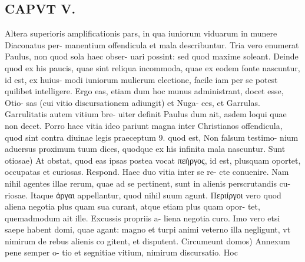 \documentclass{article}
\begin{document}
\begin{pages}
\section*{CAPVT  V. }
\marginpar{[ p.285 ]}\pstart Altera superioris amplificationis pars, in qua iuniorum viduarum in munere Diaconatus per- manentium offendicula et mala describuntur. Tria vero enumerat Paulus, non quod sola haec obser- uari possint: sed quod maxime soleant. Deinde quod ex his paucis, quae sint reliqua incommoda, quae ex eodem fonte nascuntur, id est, ex huius- modi iuniorum mulierum electione, facile iam per se potest quilibet intelligere. Ergo eas, etiam dum hoc munus administrant, docet esse, Otio- sas (cui vitio discursationem adiungit) et Nuga- ces, et Garrulas. Garrulitatis autem vitium bre- uiter definit Paulus dum ait, asdem loqui quae non decet. Porro haec vitia ideo pariunt magna inter Christianos offendicula, quod sint contra diuinae legis praeceptum 9. quod est, Non falsum testimo- nium aduersus proximum tuum dices, quodque ex his infinita mala nascuntur. Sunt otiosae) At obstat, quod eas ipsas postea vocat πεήργος, id est, plusquam oportet, occupatas et curiosas. Respond. Haec duo vitia inter se re- cte conuenire. Nam nihil agentes illae rerum, quae ad se pertinent, sunt in alienis perscrutandis cu- riosae. Itaque ἀργαι appellantur, quod nihil suum agunt. Περιίργοι vero quod aliena negotia plus quam sua curant, atque etiam plus quam opor- tet, quemadmodum ait ille. Excussis propriis a- liena negotia curo. Imo vero etsi saepe habent domi, quae agant: magno et turpi animi veterno illa negligunt, vt nimirum de rebus alienis co gitent, et disputent. Circumeunt domos) Annexum pene semper o- tio et segnitiae vitium, nimirum discursatio. Hoc  \pend

\end{pages}
\end{document}
